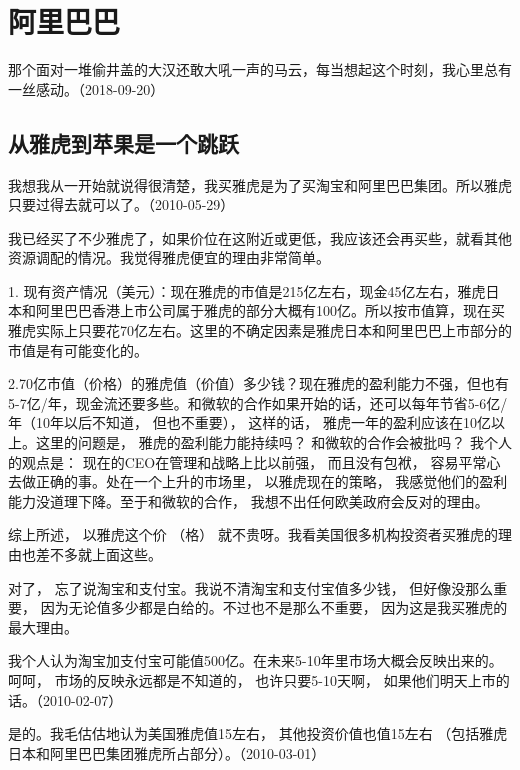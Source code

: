 
\section{阿里巴巴}

那个面对一堆偷井盖的大汉还敢大吼一声的马云，每当想起这个时刻，我心里总有一丝感动。（2018-09-20）

\subsection{从雅虎到苹果是一个跳跃}


我想我从一开始就说得很清楚，我买雅虎是为了买淘宝和阿里巴巴集团。所以雅虎只要过得去就可以了。（2010-05-29）

我已经买了不少雅虎了，如果价位在这附近或更低，我应该还会再买些，就看其他资源调配的情况。我觉得雅虎便宜的理由非常简单。

1. 现有资产情况（美元）：现在雅虎的市值是215亿左右，现金45亿左右，雅虎日本和阿里巴巴香港上市公司属于雅虎的部分大概有100亿。所以按市值算，现在买雅虎实际上只要花70亿左右。这里的不确定因素是雅虎日本和阿里巴巴上市部分的市值是有可能变化的。

2.70亿市值（价格）的雅虎值（价值）多少钱？现在雅虎的盈利能力不强，但也有5-7亿/年，现金流还要多些。和微软的合作如果开始的话，还可以每年节省5-6亿/年（10年以后不知道， 但也不重要）， 这样的话， 雅虎一年的盈利应该在10亿以上。这里的问题是， 雅虎的盈利能力能持续吗？ 和微软的合作会被批吗？ 我个人的观点是： 现在的CEO在管理和战略上比以前强， 而且没有包袱， 容易平常心去做正确的事。处在一个上升的市场里， 以雅虎现在的策略， 我感觉他们的盈利能力没道理下降。至于和微软的合作， 我想不出任何欧美政府会反对的理由。

综上所述， 以雅虎这个价 （格） 就不贵呀。我看美国很多机构投资者买雅虎的理由也差不多就上面这些。

对了， 忘了说淘宝和支付宝。我说不清淘宝和支付宝值多少钱， 但好像没那么重要， 因为无论值多少都是白给的。不过也不是那么不重要， 因为这是我买雅虎的最大理由。

我个人认为淘宝加支付宝可能值500亿。在未来5-10年里市场大概会反映出来的。呵呵， 市场的反映永远都是不知道的， 也许只要5-10天啊， 如果他们明天上市的话。（2010-02-07）


是的。我毛估估地认为美国雅虎值15左右， 其他投资价值也值15左右 （包括雅虎日本和阿里巴巴集团雅虎所占部分）。（2010-03-01）

